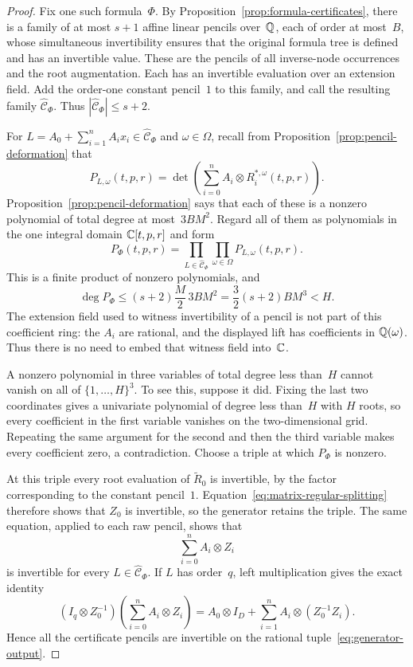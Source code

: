 \begin{proof}
Fix one such formula~$\Phi$. By
Proposition~\ref{prop:formula-certificates}, there is a family of at
most $s+1$ affine linear pencils over~$\mathbb Q$, each of order at most~$B$,
whose simultaneous invertibility ensures that the original formula
tree is defined and has an invertible value. These are the pencils
of all inverse-node occurrences and the root augmentation. Each has
an invertible evaluation over an extension field. Add the order-one
constant pencil~$1$ to this family, and call the resulting family
$\widehat{\mathcal C}_\Phi$. Thus
$|\widehat{\mathcal C}_\Phi|\le s+2$.

For $L=A_0+\sum_{i=1}^n A_i x_i\in\widehat{\mathcal C}_\Phi$ and
$\omega\in\Omega$, recall from Proposition~\ref{prop:pencil-deformation} that
\[
  P_{L,\omega}(t,p,r)
    =\det\!\left(\sum_{i=0}^n
          A_i\otimes R_i^{*,\omega}(t,p,r)\right).
\]
Proposition~\ref{prop:pencil-deformation} says that each of these is
a nonzero polynomial of total degree at most~$3BM^2$. Regard all of
them as polynomials in the one integral domain $\mathbb C[t,p,r]$ and form
\[
  P_\Phi(t,p,r)
    =\prod_{L\in\widehat{\mathcal C}_\Phi}
       \prod_{\omega\in\Omega} P_{L,\omega}(t,p,r).
\]
This is a finite product of nonzero polynomials, and
\begin{equation}
  \deg P_\Phi
    \le (s+2)\frac M2\,3BM^2
    =\frac32(s+2)BM^3
    <H.
  \label{eq:generator-product-degree}
\end{equation}
The extension field used to witness invertibility of a pencil is
not part of this coefficient ring: the $A_i$ are rational, and the
displayed lift has coefficients in $\mathbb Q(\omega)$. Thus there is no
need to embed that witness field into~$\mathbb C$.

A nonzero polynomial in three variables of total degree less
than~$H$ cannot vanish on all of $\{1,\ldots,H\}^3$. To see this,
suppose it did. Fixing the last two coordinates gives a univariate
polynomial of degree less than~$H$ with $H$ roots, so every
coefficient in the first variable vanishes on the two-dimensional
grid. Repeating the same argument for the second and then the third
variable makes every coefficient zero, a contradiction.
Choose a triple at which $P_\Phi$ is nonzero.

At this triple every root evaluation of $\widetilde R_0$ is
invertible, by the factor corresponding to the constant pencil~$1$.
Equation~\eqref{eq:matrix-regular-splitting} therefore shows that
$Z_0$ is invertible, so the generator retains the triple. The same
equation, applied to each raw pencil, shows that
\[
  \sum_{i=0}^n A_i\otimes Z_i
\]
is invertible for every $L\in\widehat{\mathcal C}_\Phi$.
If $L$ has order~$q$, left multiplication gives the exact identity
\begin{equation}
  (I_q\otimes Z_0^{-1})
       \left(\sum_{i=0}^n A_i\otimes Z_i\right)
   =A_0\otimes I_D+
       \sum_{i=1}^n A_i\otimes(Z_0^{-1}Z_i).
  \label{eq:generator-normalization}
\end{equation}
Hence all the certificate pencils are invertible on the rational
tuple~\eqref{eq:generator-output}.


\end{proof}
